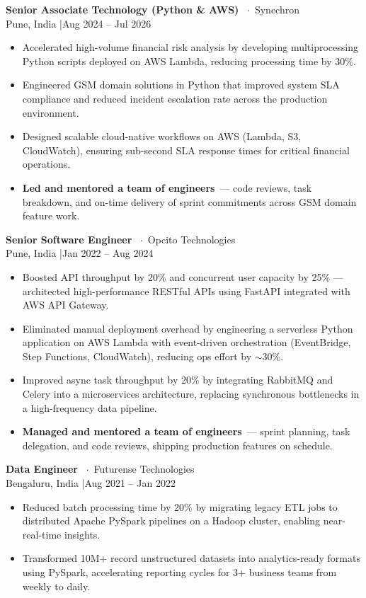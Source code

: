 \documentclass[10pt, letterpaper]{article}
\newcommand{\jobheader}[4]{%
  \vspace{2pt}%
  {\color{darktext}\textbf{#1}}%
  {\color{graytext}\ $\cdot$\ #2}\\[1pt]%
  {\small\color{graytext}#3 \quad|\quad #4}%
  \vspace{1pt}%
}
\newcommand{\bitem}[2]{%
  \item \textbf{#1}#2%
}
\begin{document}
\jobheader{Senior Associate Technology (Python \& AWS)}{Synechron}{Pune, India}{Aug 2024 -- Jul 2026}
\begin{itemize}
  \item Accelerated high-volume financial risk analysis by developing multiprocessing Python
        scripts deployed on AWS Lambda, reducing processing time by 30\%.
  \item Engineered GSM domain solutions in Python that improved system SLA compliance and
        reduced incident escalation rate across the production environment.
  \item Designed scalable cloud-native workflows on AWS (Lambda, S3, CloudWatch), ensuring
        sub-second SLA response times for critical financial operations.
  \bitem{Led and mentored a team of engineers}{\ --- code reviews, task breakdown, and
        on-time delivery of sprint commitments across GSM domain feature work.}
\end{itemize}

\jobheader{Senior Software Engineer}{Opcito Technologies}{Pune, India}{Jan 2022 -- Aug 2024}
\begin{itemize}
  \item Boosted API throughput by 20\% and concurrent user capacity by 25\% --- architected
        high-performance RESTful APIs using FastAPI integrated with AWS API Gateway.
  \item Eliminated manual deployment overhead by engineering a serverless Python application
        on AWS Lambda with event-driven orchestration (EventBridge, Step Functions,
        CloudWatch), reducing ops effort by $\sim$30\%.
  \item Improved async task throughput by 20\% by integrating RabbitMQ and Celery into a
        microservices architecture, replacing synchronous bottlenecks in a high-frequency
        data pipeline.
  \bitem{Managed and mentored a team of engineers}{\ --- sprint planning, task delegation,
        and code reviews, shipping production features on schedule.}
\end{itemize}

\jobheader{Data Engineer}{Futurense Technologies}{Bengaluru, India}{Aug 2021 -- Jan 2022}
\begin{itemize}
  \item Reduced batch processing time by 20\% by migrating legacy ETL jobs to distributed
        Apache PySpark pipelines on a Hadoop cluster, enabling near-real-time insights.
  \item Transformed 10M+ record unstructured datasets into analytics-ready formats using
        PySpark, accelerating reporting cycles for 3+ business teams from weekly to daily.
\end{itemize}
\end{document}

